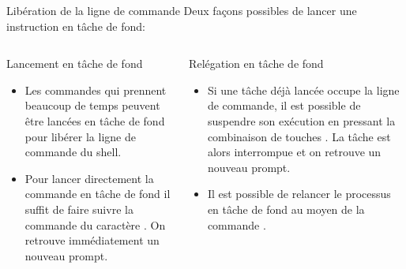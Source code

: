 \begin{frame}{Libération de la ligne de commande}
  Deux façons possibles de lancer une instruction en tâche de fond:
  \begin{columns}
    \begin{column}{6cm}
      \begin{block}{Lancement en tâche de fond}
        \begin{itemize}
        \item Les commandes qui prennent beaucoup de temps peuvent être
          lancées en tâche de fond pour libérer la ligne de commande du
          shell.
        \item Pour lancer directement la commande en tâche de fond il
          suffit de faire suivre la commande du caractère
          {\color{red}\lin{\&}}. On retrouve immédiatement un nouveau
          prompt.
        \end{itemize}
        \vspace{20pt}
        \begin{center}
          \scriptsize{  }
        \end{center}
      \end{block}
    \end{column}
    \begin{column}{6cm}
      \begin{block}{Relégation en tâche de fond}
        \begin{itemize}
        \item Si une tâche déjà lancée occupe la ligne de commande, il
          est possible de suspendre son exécution en pressant la
          combinaison de touches \Ctrl{}. La tâche est alors
          interrompue et on retrouve un nouveau prompt.
        \item Il est possible de relancer le processus en tâche de fond
          au moyen de la commande .
        \end{itemize}
        \begin{center}
          \scriptsize{  }
        \end{center}
      \end{block}
    \end{column}
  \end{columns}
\end{frame}

